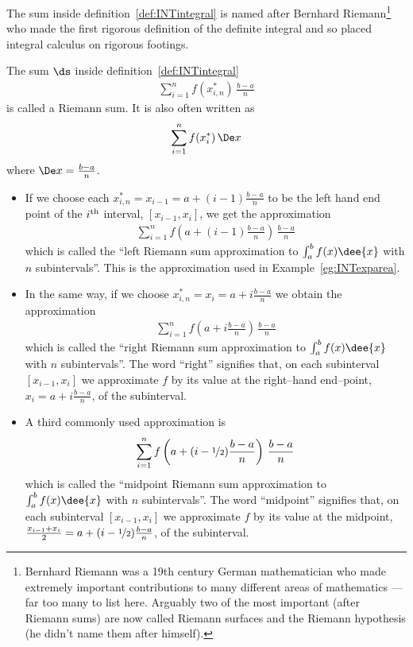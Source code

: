 The sum inside definition~\ref{def:INTintegral} is named after Bernhard
Riemann\footnote{Bernhard Riemann was a 19th century German mathematician who
made
extremely important contributions to many different areas of mathematics --- far
too
many to list here. Arguably two of the most important (after Riemann sums) are
now
called Riemann surfaces and the Riemann hypothesis (he didn't name them after
himself).}
who made the first rigorous definition of the definite integral and so placed
integral
calculus on rigorous footings.
\begin{defn}\label{def:INTthreeRiemannSums}
The sum $\ds $ inside definition~\ref{def:INTintegral}
\begin{align*}
\sum_{i=1}^n f(x_{i,n}^*)\,\frac{b-a}{n}
\end{align*}
is called a Riemann sum. It is also often written as
\begin{align*}
\sum_{i=1}^n f(x_i^*)\,\De x
\end{align*}
where $\De x = \frac{b-a}{n}$.
\begin{itemize}


\item If we choose each $x_{i,n}^* = x_{i-1}=a+(i-1)\frac{b-a}{n}$ to be the
left hand end point of the $i^{\rm th}$ interval, $[x_{i-1},x_i]$,
we get the approximation
\begin{align*}
\sum_{i=1}^n f\left(a+(i-1)\frac{b-a}{n}\right)\,\frac{b-a}{n}
\end{align*}
which is called the ``left Riemann sum approximation to
$\int_a^b f(x)\dee{x}$ with $n$ subintervals''. This is the approximation used
in
Example~\ref{eg:INTexparea}.

\item In the same way, if we choose $x_{i,n}^* = x_{i}=a+i\frac{b-a}{n}$ we
obtain
the approximation
\begin{align*}
\sum_{i=1}^n f\left(a+i\frac{b-a}{n}\right)\,\frac{b-a}{n}
\end{align*}
which is called the ``right Riemann sum approximation to
$\int_a^b f(x)\dee{x}$ with $n$ subintervals''. The word ``right'' signifies
that, on each
subinterval $[x_{i-1},x_i]$ we approximate $f$ by its value at the right--hand
end--point,
$x_i=a+i\frac{b-a}{n}$, of the subinterval.


\item A third commonly used approximation is
\begin{align*}
\sum_{i=1}^n f\left(a+(i-\nicefrac12)\frac{b-a}{n}\right)\,\frac{b-a}{n}
\end{align*}
which is called the ``midpoint Riemann sum approximation to
$\int_a^b f(x)\dee{x}$ with $n$ subintervals''. The word ``midpoint''
signifies that, on each subinterval $[x_{i-1},x_i]$ we approximate $f$
by its value at the midpoint, $\frac{x_{i-1}+x_i}{2}
=a+(i-\nicefrac{1}{2})\frac{b-a}{n}$, of the subinterval.

\end{itemize}
\end{defn}


